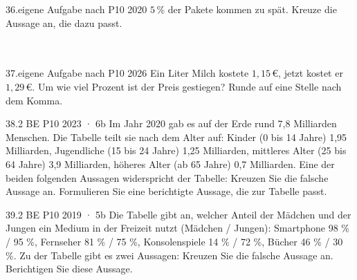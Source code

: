 \documentclass[11pt]{article}
\begin{document}
\begin{pfaufgabe}{36.}{eigene Aufgabe nach P10 2020}
$5\,\%$ der Pakete kommen zu spät. Kreuze die Aussage an, die dazu passt.\\ \\ \\ 
\end{pfaufgabe}
\begin{pfaufgabe}{37.}{eigene Aufgabe nach P10 2026}
Ein Liter Milch kostete $1{,}15\,€$, jetzt kostet er $1{,}29\,€$. Um wie viel Prozent ist der Preis gestiegen? Runde auf eine Stelle nach dem Komma.
\end{pfaufgabe}
\begin{pfaufgabe}{38.}{2 BE \textperiodcentered{} P10 2023 · 6b}
Im Jahr 2020 gab es auf der Erde rund 7,8 Milliarden Menschen. Die Tabelle teilt sie nach dem Alter auf: Kinder (0 bis 14 Jahre) 1,95 Milliarden, Jugendliche (15 bis 24 Jahre) 1,25 Milliarden, mittleres Alter (25 bis 64 Jahre) 3,9 Milliarden, höheres Alter (ab 65 Jahre) 0,7 Milliarden. Eine der beiden folgenden Aussagen widerspricht der Tabelle: Kreuzen Sie die falsche Aussage an. Formulieren Sie eine berichtigte Aussage, die zur Tabelle passt.
\end{pfaufgabe}
\begin{pfaufgabe}{39.}{2 BE \textperiodcentered{} P10 2019 · 5b}
Die Tabelle gibt an, welcher Anteil der Mädchen und der Jungen ein Medium in der Freizeit nutzt (Mädchen / Jungen): Smartphone 98 \% / 95 \%, Fernseher 81 \% / 75 \%, Konsolenspiele 14 \% / 72 \%, Bücher 46 \% / 30 \%. Zu der Tabelle gibt es zwei Aussagen: Kreuzen Sie die falsche Aussage an. Berichtigen Sie diese Aussage.
\end{pfaufgabe}
\end{document}
